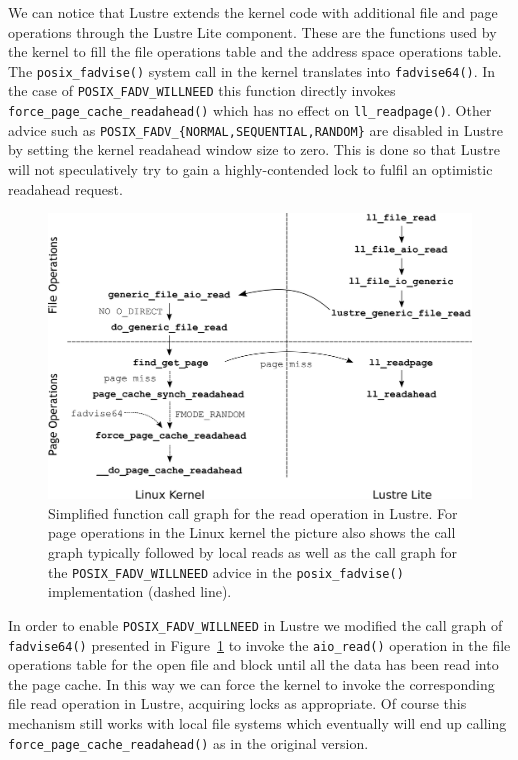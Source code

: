 We can notice that Lustre extends the kernel code with additional file and page operations through the Lustre Lite component. These are the functions used by the kernel to fill the file operations table and the address space operations table. The 
\texttt{posix\_fadvise()} system call in the kernel translates into \texttt{fadvise64()}. In the case of \texttt{POSIX\_FADV\_WILLNEED} this function directly invokes \texttt{force\_page\_cache\_readahead()} which has no effect on \texttt{ll\_readpage()}. 
Other advice such as \texttt{POSIX\_FADV\_\{NORMAL,SEQUENTIAL,RANDOM\}} are disabled in Lustre by setting the kernel readahead window size to zero. This is done so that Lustre will not speculatively try to gain a highly-contended lock to fulfil an optimistic 
readahead request.

\begin{figure}[!htb]
  \centering
  \includegraphics[width=\textwidth]{figures/linux_lustre}
  \caption{Simplified function call graph for the read operation in Lustre. For page operations in the Linux kernel the picture also shows the call graph typically followed by local reads as well as the call graph for the 
  \texttt{POSIX\_FADV\_WILLNEED} advice in the \texttt{posix\_fadvise()} implementation (dashed line).}
  \label{figure: kernel}
\end{figure}

In order to enable \texttt{POSIX\_FADV\_WILLNEED} in Lustre we modified the call graph of \texttt{fadvise64()} presented in Figure~\ref{figure: kernel} to invoke the \texttt{aio\_read()} operation in the file operations table for the open file and block 
until all the data has been read into the page cache. In this way we can force the kernel to invoke the corresponding file read operation in Lustre, acquiring locks as appropriate. Of course this mechanism still works with local file systems which eventually 
will end up calling \texttt{force\_page\_cache\_readahead()} as in the original version.

